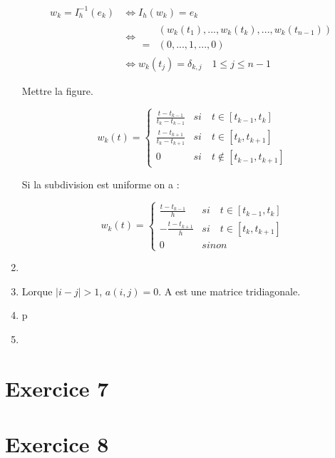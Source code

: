 \documentclass[12pt, letterpaper]{article}
\begin{document}
\begin{enumerate}
  \begin{equation*}
    \begin{split}
      w_k = I_h^{-1}(e_k) & \iff I_h(w_k) = e_k \\
      & \iff
      \begin{split}
        & (w_k(t_1), ..., w_k(t_k), ..., w_k(t_{n-1})) \\
        = & (0, ..., 1, ..., 0)
      \end{split} \\
      & \iff w_k(t_j) = \delta_{k,j} \quad 1 \le j \le n-1
    \end{split}
  \end{equation*}

  Mettre la figure.

  \begin{equation*}
    w_k(t) = 
    \left\{
    \begin{array}{ll}
      \frac{t - t_{k-1}}{t_k - t_{k-1}} & si \quad t \in [t_{k-1},
        t_k] \\
      \frac{t - t_{k+1}}{t_k - t_{k+1}} & si \quad t \in [t_k,
        t_{k+1}] \\
      0 & si \quad t \notin [t_{k-1}, t_{k+1}]
    \end{array}
    \right.
  \end{equation*}

  Si la subdivision est uniforme on a :

  \begin{equation*}
    w_k(t) = 
    \left\{
    \begin{array}{ll}
      \frac{t - t_{k-1}}{h} & si \quad t \in [t_{k-1},
        t_k] \\
      - \frac{t - t_{k+1}}{h} & si \quad t \in [t_k,
        t_{k+1}] \\
      0 & sinon
    \end{array}
    \right.
  \end{equation*}

\item

\item
  Lorque $|i - j| > 1$, $a(i, j) = 0$. A est une matrice tridiagonale.

\item

p\item
  

\end{enumerate}

\section*{Exercice 7}

\section*{Exercice 8}
\end{document}
